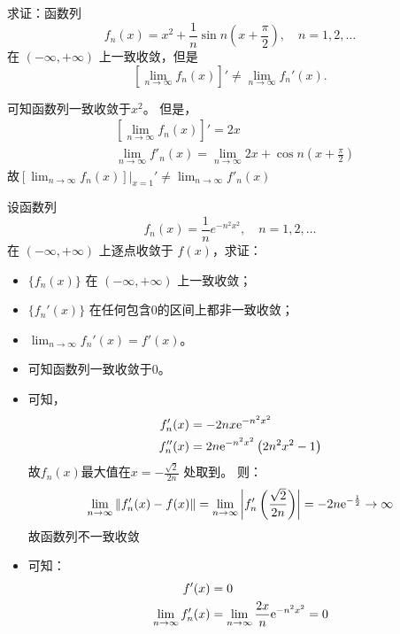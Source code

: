 \begin{problem}
    求证：函数列
    \[
        f_n(x) = x^2 + \frac{1}{n} \sin n \left( x + \frac{\pi}{2}
        \right), \quad n = 1, 2, \dots
    \]
    在 \((-\infty, +\infty)\) 上一致收敛，但是
    \[
        \left[ \lim_{n \to \infty} f_n(x) \right]' \neq \lim_{n \to
        \infty} f_n'(x).
    \]
\end{problem}

\begin{solution}
    可知函数列一致收敛于\(x^{2}\)。
    但是，
    \begin{align*}
        & \left[ \lim_{n \to \infty} f_{n}(x) \right]' = 2x        \\
        & \lim_{n \to \infty} f'_{n}(x) = \lim_{n \to \infty} 2x +
        \cos n \left( x + \frac{\pi}{2} \right)
    \end{align*}
    故\(\left.\left[ \lim_{n \to \infty} f_n(x) \right]\right|_{x=1}'
        \neq \lim_{n \to
    \infty} f'_{n}(x)\)
\end{solution}

\begin{problem}
    设函数列
    \[
        f_n(x) = \frac{1}{n} e^{-n^2 x^2}, \quad n = 1, 2, \dots
    \]
    在 \((-\infty, +\infty)\) 上逐点收敛于 \(f(x)\)，求证：
    \begin{itemize}
        \item \(\{f_n(x)\}\) 在 \((-\infty, +\infty)\) 上一致收敛；
        \item \(\{f_n'(x)\}\) 在任何包含0的区间上都非一致收敛；
        \item \(\lim_{n \to \infty} f_n'(x) = f'(x)\)。
    \end{itemize}
\end{problem}

\begin{solution}
    \begin{itemize}
        \item 可知函数列一致收敛于\(0\)。
        \item 可知，
            \begin{align*}
                f_{n}'(x)  & = -2nx\mathrm{e}^{-n^{2}x^{2}}     \\
                f_{n}''(x) & = 2n\mathrm{e}^{-n^{2}x^{2}}\left(
                2n^{2}x^{2} - 1\right)
            \end{align*}
            故\(f_{n}(x)\)最大值在\(x = -\frac{\sqrt{2}}{2n}\) 处取到。
            则： \[
                \lim_{n \to \infty} \left\lVert f_{n}'(x) - f(x)
                \right\rVert = \lim_{n \to \infty} \left|
                f'_{n}\left(\frac{\sqrt{2}}{2n}\right) \right| =
                -2n\mathrm{e}^{-\frac{1}{2}} \to \infty
            \]
            故函数列不一致收敛
        \item 可知：
            \begin{align*}
                f'(x)                         & = 0
                \\
                \lim_{n \to \infty} f'_{n}(x) & = \lim_{n \to \infty}
                \frac{2x}{n}\mathrm{e}^{-n^{2}x^{2}} = 0
            \end{align*}
    \end{itemize}
\end{solution}
